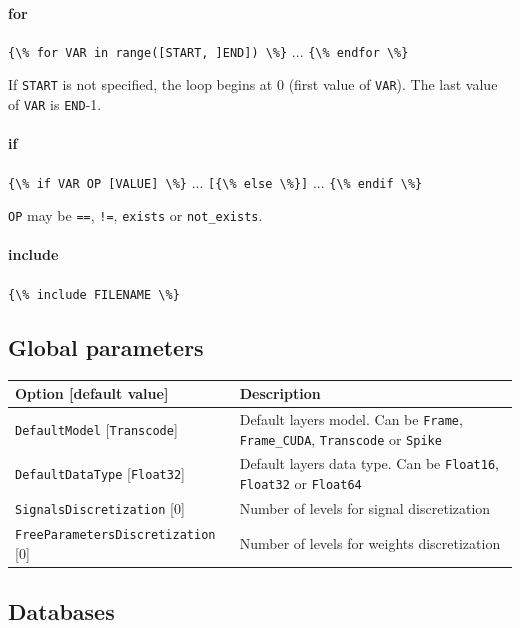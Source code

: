 \documentclass[a4paper,11pt,oneside]{article}
\begin{document}
\paragraph{for}
\lstinline!{\% for VAR in range([START, ]END]) \%}! ...
\lstinline!{\% endfor \%}!

If \lstinline!START! is not specified, the loop begins at 0 (first value of
\lstinline!VAR!). The last value of \lstinline!VAR! is \lstinline!END!-1.

\paragraph{if}
\lstinline!{\% if VAR OP [VALUE] \%}! ...
\lstinline![{\% else \%}]! ...
\lstinline!{\% endif \%}!

\lstinline!OP! may be \lstinline!==!, \lstinline?!=?, \lstinline!exists! or \lstinline!not_exists!.

\paragraph{include}
\lstinline!{\% include FILENAME \%}!


\subsection{Global parameters}

\begin{center}
 \begin{tabular}{| p{5cm} | p{10cm} | }
 \hline
 Option [default value] & Description\\
 \hline\hline
  \lstinline!DefaultModel! [\lstinline!Transcode!] & Default layers model.
  Can be \lstinline!Frame!, \lstinline!Frame_CUDA!, \lstinline!Transcode!
  or \lstinline!Spike! \\
  \lstinline!DefaultDataType! [\lstinline!Float32!] & Default layers data type.
  Can be \lstinline!Float16!, \lstinline!Float32! or \lstinline!Float64! \\
  \lstinline!SignalsDiscretization! [0] & Number of levels for signal
  discretization \\
  \lstinline!FreeParametersDiscretization! [0] & Number of levels for weights discretization \\
 \hline
\end{tabular}
\end{center}


\subsection{Databases}
\end{document}
